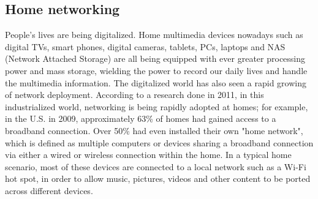 
\subsection{Home networking}
People's lives are being digitalized. Home multimedia devices nowadays such as digital TVs,
smart phones, digital cameras, tablets, PCs, laptops and NAS (Network Attached
Storage) are all being equipped with ever greater processing power and mass storage, wielding the power  to
 record our daily lives and handle the multimedia information. The digitalized world has also seen a rapid growing of network deployment. According to a research
\cite{stateofHN} done in 2011, in this industrialized world, networking
is being rapidly adopted at homes; for example, in the U.S. in 2009,
approximately 63\% of homes had gained access to a broadband connection. Over 50\% had even installed their own "home network", which is defined as multiple computers or devices sharing a broadband
 connection via either a wired or wireless connection within the home. In a typical
home scenario, most of these devices are connected to a local network such as a
Wi-Fi hot spot, in order to allow music, pictures, videos and other content to
be ported across different devices.

